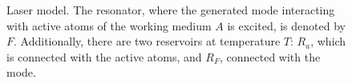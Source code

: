 \begin{figure}
\centering



\caption{Laser model. The resonator, where the generated mode interacting with active atoms of the working medium $A$ is excited, is denoted by $F$. Additionally, there are two reservoirs at temperature $T$: $R_{a}$, which is connected with the active atoms, and $R_{F}$, connected with the mode.}
\label{figPart2Laser2_2}
\end{figure}